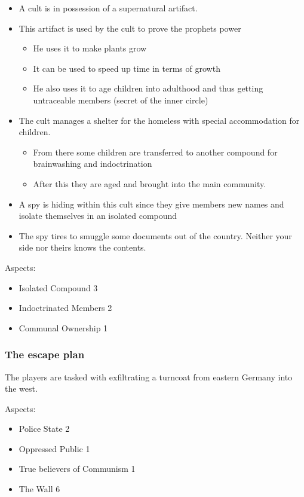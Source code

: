 \documentclass[11pt]{article}
\begin{document}
{\begin{itemize}
\item A cult is in possession of a supernatural artifact.
\item This artifact is used by the cult to prove the prophets power
\begin{itemize}
\item He uses it to make plants grow
\item It can be used to speed up time in terms of growth
\item He also uses it to age children into adulthood and thus getting untraceable members (secret of the inner circle)
\end{itemize}
\item The cult manages a shelter for the homeless with special accommodation for children.
\begin{itemize}
\item From there some children are transferred to another compound for brainwashing and indoctrination
\item After this they are aged and brought into the main community.
\end{itemize}
\item A spy is hiding within this cult since they give members new names and isolate themselves in an isolated compound
\item The spy tires to smuggle some documents out of the country. Neither your side nor theirs knows the contents.
\end{itemize}

Aspects:
\begin{itemize}
\item Isolated Compound 3
\item Indoctrinated Members 2
\item Communal Ownership 1
\end{itemize}


\subsubsection{The escape plan}
\label{sec:org698890f}

The players are tasked with exfiltrating a turncoat from eastern Germany into the west.

Aspects:
\begin{itemize}
\item Police State 2
\item Oppressed Public 1
\item True believers of Communism 1
\item The Wall 6
\end{itemize}

}
\end{document}

